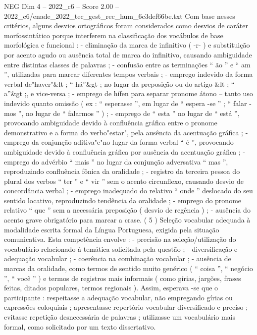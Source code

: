 \begin{textsample}{NEG Dim 4 – 2022\_c6 – Score 2.00 – 2022\_c6/enade\_2022\_tec\_gest\_rec\_hum\_6c3def66be.txt}
Com base nesses critérios, alguns desvios ortográficos foram considerados como desvios de caráter morfossintático porque interferem na classificação dos vocábulos de base morfológica e funcional : - eliminação da marca de infinitivo ( -r- ) e substituição por acento agudo ou ausência total de marca do infinitivo, causando ambiguidade entre distintas classes de palavras ; - confusão entre as terminações “ ão ” e “ am ”, utilizadas para marcar diferentes tempos verbais ; - emprego indevido da forma verbal de"haver"\&lt ; “ há”\&gt ; no lugar da preposição ou do artigo \&lt ; “ a”\&gt ;, e vice-versa ; - emprego de hífen para separar pronome átono – tanto uso indevido quanto omissão ( ex : “ esperasse ”, em lugar de “ espera -se ” ; “ falar -mos ”, no lugar de “ falarmos ” ) ; - emprego de “ esta ” no lugar de “ está ”, provocando ambiguidade devido à confluência gráfica entre o pronome demonstrativo e a forma do verbo"estar", pela ausência da acentuação gráfica ; - emprego da conjunção aditiva"e"no lugar da forma verbal “ é ”, provocando ambiguidade devido à confluência gráfica por ausência da acentuação gráfica ; - emprego do advérbio “ mais ” no lugar da conjunção adversativa “ mas ”, reproduzindo confluência fônica da oralidade ; - registro da terceira pessoa do plural dos verbos “ ter ” e “ vir ” sem o acento circunflexo, causando desvio de concordância verbal ; - emprego inadequado do relativo “ onde ” deslocado do seu sentido locativo, reproduzindo tendência da oralidade ; - emprego do pronome relativo “ que ” sem a necessária preposição ( desvio de regência ) ; - ausência do acento grave obrigatório para marcar a crase. ( 5 ) Seleção vocabular adequada à modalidade escrita formal da Língua Portuguesa, exigida pela situação comunicativa.
Esta competência envolve : - precisão na seleção/utilização do vocabulário relacionado à temática solicitada pela questão ; - diversificação e adequação vocabular ; - coerência na combinação vocabular ; - ausência de marcas da oralidade, como termos de sentido muito genérico ( “ coisa ”, “ negócio ”, “ você ” ) e termos de registros mais informais ( como gírias, jargões, frases feitas, ditados populares, termos regionais ).
Assim, esperava -se que o participante : respeitasse a adequação vocabular, não empregando gírias ou expressões coloquiais ; apresentasse repertório vocabular diversificado e preciso ; evitasse repetição desnecessária de palavras ; utilizasse um vocabulário mais formal, como solicitado por um texto dissertativo.

\end{textsample}
